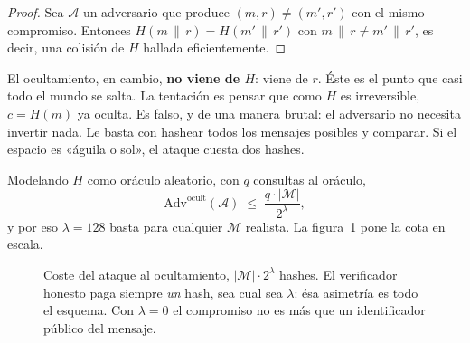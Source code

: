 \documentclass[11pt,a4paper]{article}
\theoremstyle{definition}
\theoremstyle{plain}
\theoremstyle{remark}
\newcommand{\concat}{\,\|\,}
\newcommand{\Adv}{\mathrm{Adv}}
\begin{document}
\begin{proof}
Sea $\mathcal{A}$ un adversario que produce $(m,r) \neq (m',r')$ con el mismo
compromiso. Entonces $H(m \concat r) = H(m' \concat r')$ con
$m \concat r \neq m' \concat r'$, es decir, una colisión de $H$ hallada
eficientemente.
\end{proof}

El ocultamiento, en cambio, \textbf{no viene de $H$}: viene de $r$. Éste es el
punto que casi todo el mundo se salta. La tentación es pensar que como $H$ es
irreversible, $c = H(m)$ ya oculta. Es falso, y de una manera brutal: el
adversario no necesita invertir nada. Le basta con hashear todos los mensajes
posibles y comparar. Si el espacio es «águila o sol», el ataque cuesta dos hashes.

Modelando $H$ como oráculo aleatorio, con $q$ consultas al oráculo,
\begin{equation}\label{eq:hidebound}
  \Adv^{\text{ocult}}(\mathcal{A}) \;\le\; \frac{q \cdot |\mathcal{M}|}{2^{\lambda}},
\end{equation}
y por eso $\lambda = 128$ basta para cualquier $\mathcal{M}$ realista. La
figura~\ref{fig:coste} pone la cota en escala.

\begin{figure}[htbp]
\centering
{}
\caption{Coste del ataque al ocultamiento, $|\mathcal{M}|\cdot 2^{\lambda}$
hashes. El verificador honesto paga siempre \emph{un} hash, sea cual sea
$\lambda$: ésa asimetría es todo el esquema. Con $\lambda = 0$ el compromiso no
es más que un identificador público del mensaje.}
\label{fig:coste}
\end{figure}
\end{document}
